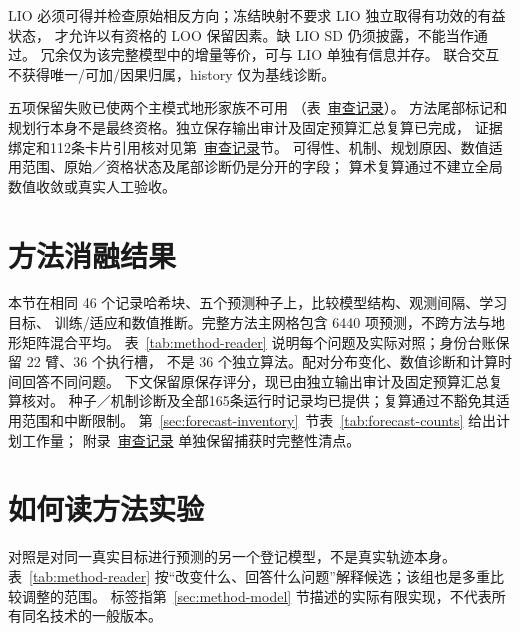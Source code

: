LIO 必须可得并检查原始相反方向；冻结映射不要求 LIO 独立取得有功效的有益状态，
才允许以有资格的 LOO 保留因素。缺 LIO SD 仍须披露，不能当作通过。
冗余仅为该完整模型中的增量等价，可与 LIO 单独有信息并存。
联合交互不获得唯一/可加/因果归属，history 仅为基线诊断。

五项保留失败已使两个主模式地形家族不可用
（表~\href{audit-notes.pdf\#tab:failure-family-dispositions}{审查记录}）。
方法尾部标记和规划行本身不是最终资格。独立保存输出审计及固定预算汇总复算已完成，
证据绑定和112条卡片引用核对见第~\href{audit-notes.pdf\#sec:audited-review-update}{审查记录}节。
可得性、机制、规划原因、数值适用范围、原始／资格状态及尾部诊断仍是分开的字段；
算术复算通过不建立全局数值收敛或真实人工验收。


\section{方法消融结果}
\label{sec:method-results}\hypertarget{sec:method-results}{}
本节在相同 46 个记录哈希块、五个预测种子上，比较模型结构、观测间隔、学习目标、
训练/适应和数值推断。完整方法主网格包含 6440 项预测，不跨方法与地形矩阵混合平均。
表~\ref{tab:method-reader} 说明每个问题及实际对照；身份台账保留 22 臂、36 个执行槽，
不是 36 个独立算法。配对分布变化、数值诊断和计算时间回答不同问题。
下文保留原保存评分，现已由独立输出审计及固定预算汇总复算核对。
种子／机制诊断及全部165条运行时记录均已提供；复算通过不豁免其适用范围和中断限制。
第~\ref{sec:forecast-inventory}~节表~\ref{tab:forecast-counts} 给出计划工作量；
附录~\href{audit-notes.pdf\#sec:execution-coverage}{审查记录} 单独保留捕获时完整性清点。


\section{如何读方法实验}
\label{sec:method-reader}\hypertarget{sec:method-reader}{}
对照是对同一真实目标进行预测的另一个登记模型，不是真实轨迹本身。
表~\ref{tab:method-reader} 按“改变什么、回答什么问题”解释候选；该组也是多重比较调整的范围。
标签指第~\ref{sec:method-model} 节描述的实际有限实现，不代表所有同名技术的一般版本。

